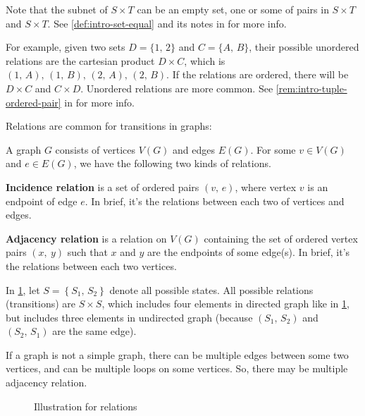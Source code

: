 \documentclass[../src/handouts/main.tex]{subfiles}
\begin{document}
Note that the subnet of $S \times T$ can be an empty set, one or some of pairs in $S \times T$ and $S \times T$. See \cref{def:intro-set-equal} and its notes in  for more info.

For example, given two sets $D = \{ 1,\, 2\}$ and $C = \{ A,\, B \}$, their possible unordered relations are the cartesian product $D \times C$, which is $(1,\, A),\, (1,\, B),\, (2,\, A),\, (2,\, B)$. If the relations are ordered, there will be $D \times C$ and $C \times D$. Unordered relations are more common. See \cref{rem:intro-tuple-ordered-pair} in  for more info.

Relations are common for transitions in graphs:
\begin{enumerate*}
  \item A graph $G$ consists of vertices $V(G)$ and edges $E(G)$. For some $v \in V(G)$ and $e \in E(G)$, we have the following two kinds of relations.
  \item \textbf{Incidence relation} is a set of ordered pairs $(v,\, e)$, where vertex $v$ is an endpoint of edge $e$. In brief, it's the relations between each two of vertices and edges.
  \item \textbf{Adjacency relation} is a relation on $V(G)$ containing the set of ordered vertex pairs $(x,\ y)$ such that $x$ and $y$ are the endpoints of some edge(s). In brief, it's the relations between each two vertices.
  \item In \cref{fig:intro-relation}, let $S = \left\{ S_1,\, S_2 \right\}$ denote all possible states. All possible relations (transitions) are $S \times S$, which includes four elements in directed graph like in \cref{fig:intro-relation}, but includes three elements in undirected graph (because $(S_1,\, S_2)$ and $(S_2,\, S_1)$ are the same edge).
  \item If a graph is not a simple graph, there can be multiple edges between some two vertices, and can be multiple loops on some vertices. So, there may be multiple adjacency relation.
\end{enumerate*}

\begin{figure}[htbp]
  \centering
  \caption{Illustration for relations}
  \label{fig:intro-relation}
\end{figure}
\end{document}
